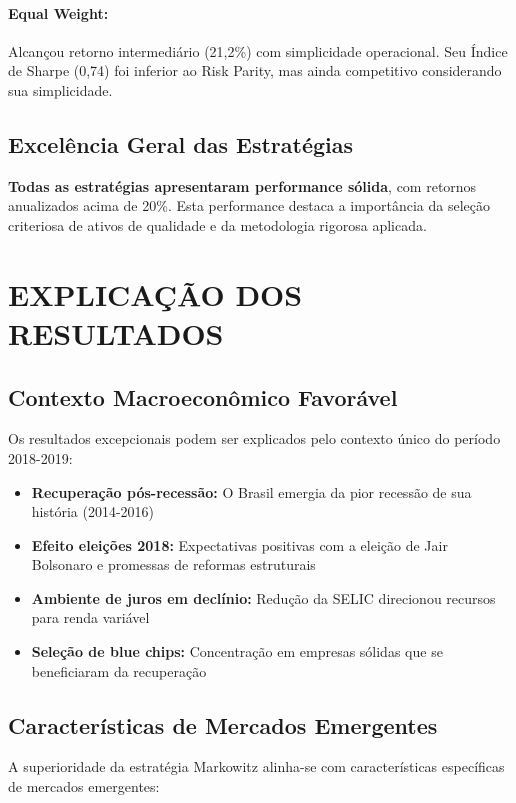 \paragraph{Equal Weight:} Alcançou retorno intermediário (21,2\%) com simplicidade operacional. Seu Índice de Sharpe (0,74) foi inferior ao Risk Parity, mas ainda competitivo considerando sua simplicidade.

\subsection{Excelência Geral das Estratégias}

\textbf{Todas as estratégias apresentaram performance sólida}, com retornos anualizados acima de 20\%. Esta performance destaca a importância da seleção criteriosa de ativos de qualidade e da metodologia rigorosa aplicada.

\section{EXPLICAÇÃO DOS RESULTADOS}

\subsection{Contexto Macroeconômico Favorável}

Os resultados excepcionais podem ser explicados pelo contexto único do período 2018-2019:

\begin{itemize}
    \item \textbf{Recuperação pós-recessão:} O Brasil emergia da pior recessão de sua história (2014-2016)
    \item \textbf{Efeito eleições 2018:} Expectativas positivas com a eleição de Jair Bolsonaro e promessas de reformas estruturais
    \item \textbf{Ambiente de juros em declínio:} Redução da SELIC direcionou recursos para renda variável
    \item \textbf{Seleção de blue chips:} Concentração em empresas sólidas que se beneficiaram da recuperação
\end{itemize}

\subsection{Características de Mercados Emergentes}

A superioridade da estratégia Markowitz alinha-se com características específicas de mercados emergentes:

